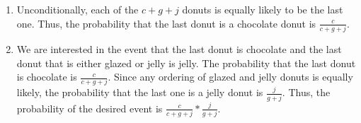 \begin{enumerate}[label=(\alph*)]
\item Unconditionally, each of the $c + g + j$ donuts is equally likely to be
the last one. Thus, the probability that the last donut is a chocolate donut is
$\frac{c}{c + g + j}$.

\item We are interested in the event that the last donut is chocolate and the
last donut that is either glazed or jelly is jelly. The probability that the
last donut is chocolate is $\frac{c}{c + g + j}$. Since any ordering of glazed
and jelly donuts is equally likely, the probability that the last one is a jelly
donut is $\frac{j}{g + j}$. Thus, the probability of the desired event is
$\frac{c}{c + g + j}*\frac{j}{g + j}$.
\end{enumerate}